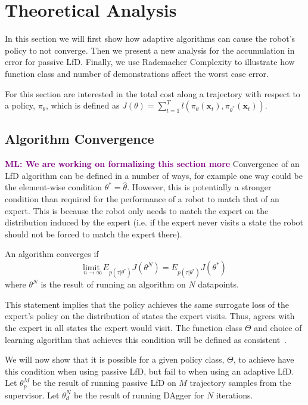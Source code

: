 \documentclass[10pt, conference]{ieeeconf}      %
\newcommand{\bx}{\mathbf{x}}
\newcommand{\mlnote}[1]{\ifthenelse{ \boolean{include-notes}}%
 {\textcolor{purple}{\textbf{ML: #1}}}{}}
\begin{document}
 

\section{Theoretical Analysis}
In this section we will first show how adaptive algorithms can cause the robot's policy to not converge. Then we present a new analysis for the accumulation in error for  passive LfD.  Finally, we use Rademacher Complexity to illustrate how function class and number of demonstrations affect the worst case error. 

For this section are interested in the total cost along a trajectory with respect to a policy, $\pi_{\theta}$, which is defined as $J(\theta) = \sum^T_{t=1} l(\pi_{\theta}(\bx_{t}),\pi_{\theta^*}(\bx_{t}))$. 

\subsection{Algorithm Convergence}
\mlnote{We are working on formalizing this section more}
Convergence of an LfD algorithm can be defined in a number of ways, for example one way could be the element-wise condition $\theta^* = \hat{\theta}$. However, this is potentially a stronger condition than required for the performance of a robot to match that of an expert.  This is because the robot only needs to match the expert on the distribution induced by the expert (i.e. if the expert never visits a state the robot should not be forced to match the expert there). 

An algorithm converges if
$$\underset{n \rightarrow \infty}{\text{limit }} E_{p(\tau|\theta^*)}J(\theta^N)  = E_{p(\tau|\theta^*)}J(\theta^*) $$
\noindent where $\theta^N$ is the result of running an algorithm on $N$ datapoints.

This statement implies that the policy achieves the same surrogate loss of the expert's policy on the distribution of states the expert visits. Thus, agrees with the expert in all states the expert would visit.  The function class $\Theta$ and choice of learning algorithm that achieves this condition will be defined as consistent~\cite{vapnik1992principles}.

We will now show that it is possible for a given policy class, $\Theta$, to achieve have this condition when using passive LfD, but fail to when using an adaptive LfD. \\
Let $\theta_{p}^M$ be the result of running passive LfD on $M$ trajectory samples from the supervisor.
Let $\theta_{d}^N$ be the result of running DAgger for $N$ iterations.
\end{document}
